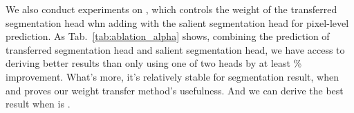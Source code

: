 \documentclass[final]{cvpr}
\begin{document}
We also conduct experiments on , which controls the weight of the transferred segmentation head whn adding with the salient segmentation head for pixel-level prediction. As Tab.~\ref{tab:ablation_alpha} shows, combining the prediction of transferred segmentation head and salient segmentation head, we have access to deriving better results than only using one of two heads by at least \% improvement. What's more, it's relatively stable for segmentation result, when  and proves our weight transfer method's usefulness. And we can derive the best result when  is .

\begin{table}[htbp]
    
\caption{Results on PASCAL val set when the weight of salient segmentation head () varies.}
    \label{tab:ablation_alpha}
\end{table}



\begin{table}[htbp]
    \caption{Results on PASCAL val and COCO val when using the merging and dropping strategies or not.} 
    \centering
    \label{tab:retrainstrategies}
\end{table}
\end{document}
